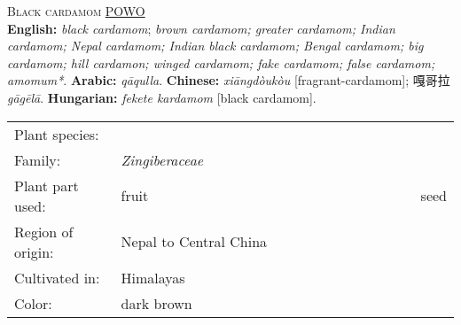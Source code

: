 \begin{spice}\label{spice:black cardamom}
\textsc{Black cardamom} \hfill \href{https://powo.science.kew.org/taxon/urn:lsid:ipni.org:names:872166-1}{POWO} \\
\textbf{English:} \textit{black cardamom}; \textit{brown cardamom; greater cardamom; Indian cardamom; Nepal cardamom; Indian black cardamom; Bengal cardamom; big cardamom; hill cardamon; winged cardamom; fake cardamom; false cardamom; amomum*}. 
\textbf{Arabic:} {} \textit{qāqulla}. 
\textbf{Chinese:} {} \textit{xiāngdòukòu} [fragrant-cardamom]; 嘎哥拉 \textit{gāgēlā}. 
\textbf{Hungarian:} \textit{fekete kardamom} [black cardamom].  \\
\noindent{\color{black}\rule[0.5ex]{\linewidth}{.5pt}}
\begin{tabular}{@{}p{0.25\linewidth}@{}p{0.75\linewidth}@{}}
Plant species: &  \\
Family: & \textit{Zingiberaceae} \\
Plant part used: & fruit & seed \\
Region of origin: & Nepal to Central China \\
Cultivated in: & Himalayas \\
Color: & dark brown \\
\end{tabular}
\end{spice}